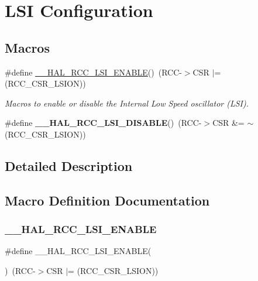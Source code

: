 \hypertarget{group___r_c_c___l_s_i___configuration}{}\section{L\+SI Configuration}
\label{group___r_c_c___l_s_i___configuration}
\subsection*{Macros}
\begin{DoxyCompactItemize}
\item 
\#define \mbox{\hyperlink{group___r_c_c___l_s_i___configuration_ga560de8b8991db4a296de878a7a8aa58b}{\+\_\+\+\_\+\+H\+A\+L\+\_\+\+R\+C\+C\+\_\+\+L\+S\+I\+\_\+\+E\+N\+A\+B\+LE}}()~(R\+CC-\/$>$C\+SR $\vert$= (R\+C\+C\+\_\+\+C\+S\+R\+\_\+\+L\+S\+I\+ON))
\begin{DoxyCompactList}\small\item\em Macros to enable or disable the Internal Low Speed oscillator (L\+SI). \end{DoxyCompactList}\item 
\mbox{\label{group___r_c_c___l_s_i___configuration_ga4f96095bb4acda60b7f66d5d927da181}} 
\#define {\bfseries \+\_\+\+\_\+\+H\+A\+L\+\_\+\+R\+C\+C\+\_\+\+L\+S\+I\+\_\+\+D\+I\+S\+A\+B\+LE}()~(R\+CC-\/$>$C\+SR \&= $\sim$(R\+C\+C\+\_\+\+C\+S\+R\+\_\+\+L\+S\+I\+ON))
\end{DoxyCompactItemize}


\subsection{Detailed Description}


\subsection{Macro Definition Documentation}
\mbox{\label{group___r_c_c___l_s_i___configuration_ga560de8b8991db4a296de878a7a8aa58b}} 
\subsubsection{\texorpdfstring{\_\_HAL\_RCC\_LSI\_ENABLE}{\_\_HAL\_RCC\_LSI\_ENABLE}}
{\footnotesize\ttfamily \#define \+\_\+\+\_\+\+H\+A\+L\+\_\+\+R\+C\+C\+\_\+\+L\+S\+I\+\_\+\+E\+N\+A\+B\+LE(\begin{DoxyParamCaption}{ }\end{DoxyParamCaption})~(R\+CC-\/$>$C\+SR $\vert$= (R\+C\+C\+\_\+\+C\+S\+R\+\_\+\+L\+S\+I\+ON))}



